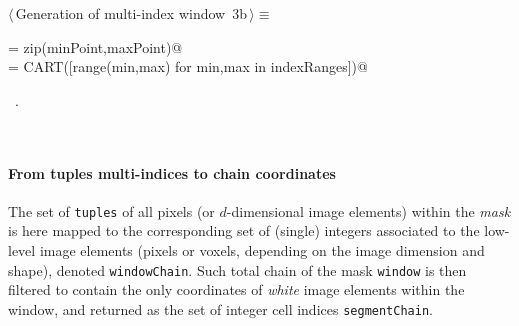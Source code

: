 \documentclass[11pt,oneside]{article}	%
\begin{document}
\begin{flushleft} \small
\begin{minipage}{\linewidth} \label{scrap5}
\protect{}$\langle\,$Generation of multi-index window\nobreak\ {\footnotesize 3b}$\,\rangle\equiv$
\vspace{-1ex}
\begin{list}{}{} \item
\mbox{}\verb@indexRanges = zip(minPoint,maxPoint)@\\
\mbox{}\verb@tuples = CART([range(min,max) for min,max in indexRanges])@\\
\mbox{}\verb@@{\NWsep}
\end{list}
\vspace{-1ex}
\footnotesize\addtolength{\baselineskip}{-1ex}
\begin{list}{}{\setlength{\itemsep}{-\parsep}\setlength{\itemindent}{-\leftmargin}}
\item \NWtxtMacroRefIn\ .
\end{list}
\end{minipage}\\[4ex]
\end{flushleft}

\paragraph{From tuples multi-indices to chain coordinates}

The set of \texttt{tuples} of all pixels (or $d$-dimensional image elements) within the \emph{mask} is here mapped to the corresponding set of (single) integers associated to the low-level image elements (pixels or voxels, depending on the image dimension and shape), denoted \texttt{windowChain}. Such total chain of the mask \texttt{window} is then filtered to contain the only coordinates of \emph{white} image elements within the window, and returned as the set of integer cell indices \texttt{segmentChain}.
\end{document}
